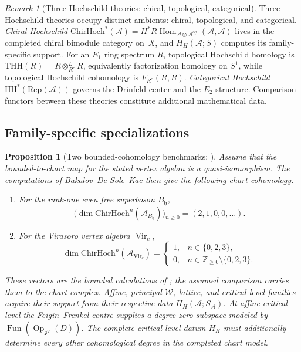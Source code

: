 \documentclass[11pt]{article}
\theoremstyle{plain}
\newtheorem{proposition}[theorem]{Proposition}
\theoremstyle{definition}
\theoremstyle{remark}
\newtheorem{remark}[theorem]{Remark}
\newcommand{\fg}{\mathfrak{g}}
\newcommand{\cA}{\mathcal{A}}
\newcommand{\cW}{\mathcal{W}}
\newcommand{\ChirHoch}{\mathrm{ChirHoch}}
\begin{document}
\begin{remark}[Three Hochschild theories: chiral, topological, categorical]
\label{warn:three-hochschild}
Three Hochschild theories occupy distinct ambients: chiral,
topological, and categorical.
\emph{Chiral Hochschild}
$\ChirHoch^*(\cA)=
H^*R\!\operatorname{Hom}_{\cA\otimes\cA^{\mathrm{op}}}(\cA,\cA)$
lives in the completed chiral bimodule category on~$X$, and
$H_H(\cA;S)$ computes its family-specific support.
For an $E_1$ ring spectrum $R$, topological Hochschild homology is
$\mathrm{THH}(R)=R\otimes^L_{R^e}R$, equivalently factorization
homology on $S^1$, while topological Hochschild cohomology is
$F_{R^e}(R,R)$.  \emph{Categorical Hochschild}
$\mathrm{HH}^*(\mathrm{Rep}(\cA))$ governs the
Drinfeld center and the $E_2$ structure.  Comparison functors between
these theories constitute additional mathematical data.
\end{remark}

\subsection{Family-specific specializations}

\begin{proposition}[Two bounded-cohomology benchmarks;
\ClaimStatusConditional]
\label{prop:hilbert-families}
Assume that the bounded-to-chart map for the stated vertex algebra is
a quasi-isomorphism.  The computations of Bakalov--De Sole--Kac then
give the following chart cohomology.
\begin{enumerate}[label=\textup{(\roman*)}]
\item For the rank-one even free superboson $B_{\mathfrak h}$,
\[
 \bigl(\dim\ChirHoch^n(\cA_{B_{\mathfrak h}})\bigr)_{n\geq0}
 =(2,1,0,0,\ldots).
\]
\item For the Virasoro vertex algebra $\operatorname{Vir}_c$,
\[
 \dim\ChirHoch^n(\cA_{\operatorname{Vir}_c})
 =\begin{cases}
 1,&n\in\{0,2,3\},\\
 0,&n\in\mathbb Z_{\geq0}\setminus\{0,2,3\}.
 \end{cases}
\]
\end{enumerate}
These vectors are the bounded calculations of
\cite[Theorems~7.4 and~7.2]{BDSK21}; the assumed comparison carries
them to the chart complex.  Affine, principal $\cW$, lattice, and
critical-level families acquire their support from their respective
data $H_H(\cA;S_\cA)$.  At affine critical level the
Feigin--Frenkel centre supplies a degree-zero subspace modeled by
$\operatorname{Fun}(\operatorname{Op}_{\fg^\vee}(D))$.  The complete
critical-level datum $H_H$ must additionally determine every other
cohomological degree in the completed chart model.
\end{proposition}
\end{document}

